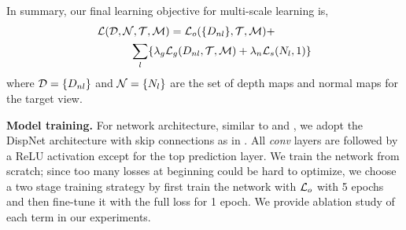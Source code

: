 In summary, our final learning objective for multi-scale learning is,
\begin{align}
\label{eq:full_loss}
&{\mathcal L}({\mathcal D}, {\mathcal N}, {\mathcal T}, {\mathcal M}) = {\mathcal L}_{o}(\{D_{nl}\}, {\mathcal T}, {\mathcal M}) + \nonumber\\
&\text{~~~~~~~~~}\sum_l\{\lambda_g{\mathcal L}_{g}(D_{nl},{\mathcal T},{\mathcal M}) + \lambda_n{\mathcal L}_{s}(N_l, 1)\}
\end{align}
where ${\mathcal D} = \{D_{nl}\}$ and ${\mathcal N} = \{N_{l}\}$ are the set of depth maps and normal maps for the target view.


\textbf{Model training.} For network architecture, similar to \cite{zhou2017unsupervised} and \cite{godard2016unsupervised}, we adopt the DispNet \cite{mayer2016large} architecture with skip connections as in \cite{zhou2017unsupervised}. All \textit{conv} layers are followed by a ReLU activation except for the top prediction layer. We train the network from scratch; since too many losses at beginning could be hard to optimize, we choose a two stage training strategy by first train the network with ${\mathcal L}_{o}$ with 5 epochs and then fine-tune it with the full loss for 1 epoch. We provide ablation study of each term in our experiments.





